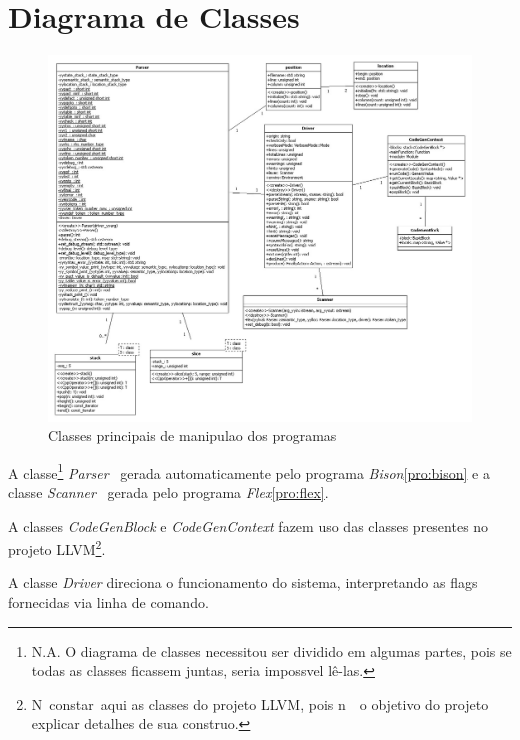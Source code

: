 \section{Diagrama de Classes}

\label{pro:classes}

\begin{figure}[!htp]
  \begin{center}
    \includegraphics[width=1\textwidth]{figuras/classes1}
  \end{center}
  \caption{Classes principais de manipula\ca o dos programas}
  \label{fig:classes1}
\end{figure}

A classe\footnote{N.A. O diagrama de classes necessitou ser dividido em algumas partes, pois se todas as classes ficassem juntas, seria imposs\ih vel l\^e-las.} \emph{Parser} \eh\ gerada automaticamente pelo programa \emph{Bison}\ref{pro:bison} e a classe \emph{Scanner} \eh\ gerada pelo programa \emph{Flex}\ref{pro:flex}.

A classes \emph{CodeGenBlock} e \emph{CodeGenContext} fazem uso das classes presentes no projeto LLVM\footnote{N\ao\ constar\ao\ aqui as classes do projeto LLVM, pois n\ao\ \eh\ o objetivo do projeto explicar detalhes de sua constru\ca o.}.

A classe \emph{Driver} direciona o funcionamento do sistema, interpretando as flags fornecidas via linha de comando.

